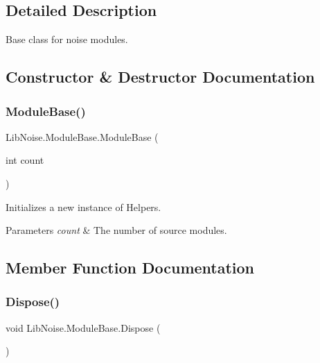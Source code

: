 \subsection{Detailed Description}
Base class for noise modules. 



\subsection{Constructor \& Destructor Documentation}
\mbox{\label{class_lib_noise_1_1_module_base_a79db52ea9d135eff82bb3e3213fd668c}} 
\subsubsection{\texorpdfstring{Module\+Base()}{ModuleBase()}}
{\footnotesize\ttfamily Lib\+Noise.\+Module\+Base.\+Module\+Base (\begin{DoxyParamCaption}\item[{int}]{count }\end{DoxyParamCaption})\hspace{0.3cm}{\ttfamily [protected]}}



Initializes a new instance of Helpers. 


\begin{DoxyParams}{Parameters}
{\em count} & The number of source modules.\\
\hline
\end{DoxyParams}


\subsection{Member Function Documentation}
\mbox{\label{class_lib_noise_1_1_module_base_a0f281ab3bfc1fe8aef486a80cbe4db01}} 
\subsubsection{\texorpdfstring{Dispose()}{Dispose()}}
{\footnotesize\ttfamily void Lib\+Noise.\+Module\+Base.\+Dispose (\begin{DoxyParamCaption}{ }\end{DoxyParamCaption})}



